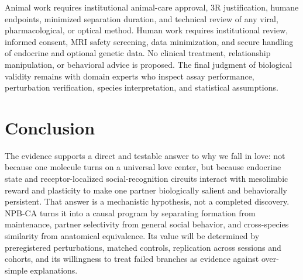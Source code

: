 \documentclass[conference]{IEEEtran}
\begin{document}
Animal work requires institutional animal-care approval, 3R justification, humane endpoints, minimized separation duration, and technical review of any viral, pharmacological, or optical method. Human work requires institutional review, informed consent, MRI safety screening, data minimization, and secure handling of endocrine and optional genetic data. No clinical treatment, relationship manipulation, or behavioral advice is proposed. The final judgment of biological validity remains with domain experts who inspect assay performance, perturbation verification, species interpretation, and statistical assumptions.

\section{Conclusion}
The evidence supports a direct and testable answer to why we fall in love: not because one molecule turns on a universal love center, but because endocrine state and receptor-localized social-recognition circuits interact with mesolimbic reward and plasticity to make one partner biologically salient and behaviorally persistent. That answer is a mechanistic hypothesis, not a completed discovery. NPB-CA turns it into a causal program by separating formation from maintenance, partner selectivity from general social behavior, and cross-species similarity from anatomical equivalence. Its value will be determined by preregistered perturbations, matched controls, replication across sessions and cohorts, and its willingness to treat failed branches as evidence against over-simple explanations.

\appendices
\end{document}
